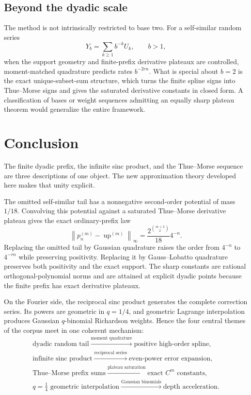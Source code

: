 \documentclass[11pt]{article}
\numberwithin{equation}{section}
\theoremstyle{definition}
\theoremstyle{remark}
\newcommand{\Up}{\operatorname{up}}
\newcommand{\norm}[1]{\left\lVert#1\right\rVert}
\begin{document}
\subsection{Beyond the dyadic scale}

The method is not intrinsically restricted to base two.  For a self-similar random series
\[
 Y_b=\sum_{k\ge1}b^{-k}U_k,
 \qquad b>1,
\]
when the support geometry and finite-prefix derivative plateaux are controlled, moment-matched quadrature predicts rates $b^{-2rn}$.  What is special about $b=2$ is the exact unique-subset-sum structure, which turns the finite spline signs into Thue--Morse signs and gives the saturated derivative constants in closed form.  A classification of bases or weight sequences admitting an equally sharp plateau theorem would generalize the entire framework.

\section{Conclusion}
\label{sec:conclusion}

The finite dyadic prefix, the infinite sinc product, and the Thue--Morse sequence are three descriptions of one object.  The new approximation theory developed here makes that unity explicit.

The omitted self-similar tail has a nonnegative second-order potential of mass $1/18$.  Convolving this potential against a saturated Thue--Morse derivative plateau gives the exact ordinary-prefix law
\[
 \norm{p_n^{(m)}-\Up^{(m)}}_\infty
 =\frac{2^{\binom{m+3}{2}}}{18}4^{-n}.
\]
Replacing the omitted tail by Gaussian quadrature raises the order from $4^{-n}$ to $4^{-rn}$ while preserving positivity.  Replacing it by Gauss--Lobatto quadrature preserves both positivity and the exact support.  The sharp constants are rational orthogonal-polynomial norms and are attained at explicit dyadic points because the finite prefix has exact derivative plateaux.

On the Fourier side, the reciprocal sinc product generates the complete correction series.  Its powers are geometric in $q=1/4$, and geometric Lagrange interpolation produces Gaussian $q$-binomial Richardson weights.  Hence the four central themes of the corpus meet in one coherent mechanism:
\begin{equation}
 \boxed{
 \begin{gathered}
 \text{dyadic random tail}
 \xrightarrow{\text{moment quadrature}}
 \text{positive high-order spline},\\
 \text{infinite sinc product}
 \xrightarrow{\text{reciprocal series}}
 \text{even-power error expansion},\\
 \text{Thue--Morse prefix sums}
 \xrightarrow{\text{plateau saturation}}
 \text{exact }C^m\text{ constants},\\
 q=\tfrac14\text{ geometric interpolation}
 \xrightarrow{\text{Gaussian binomials}}
 \text{depth acceleration}.
 \end{gathered}}
 \label{eq:four-way-summary}
\end{equation}
\end{document}
